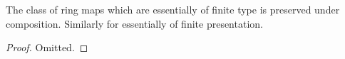 \begin{lemma}
\label{lemma-composition-essentially-of-finite-type}
The class of ring maps which are essentially of finite type is
preserved under composition. Similarly for essentially of finite
presentation.
\end{lemma}

\begin{proof}
Omitted.
\end{proof}